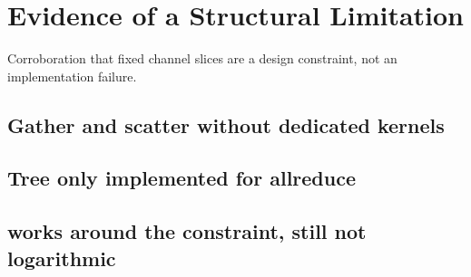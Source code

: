 \chapter{Evidence of a Structural Limitation}\label{ch:limits}

Corroboration that fixed channel slices are a design constraint, not an implementation failure.

\section{Gather and scatter without dedicated kernels}
\section{Tree only implemented for allreduce}
\section{\pat{} works around the constraint, still not logarithmic}
